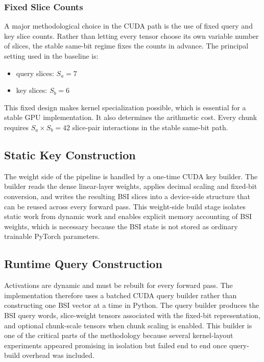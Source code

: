 \subsubsection{Fixed Slice Counts}
A major methodological choice in the CUDA path is the use of fixed query and key slice counts. Rather than letting every tensor choose its own variable number of slices, the stable same-bit regime fixes the counts in advance. The principal setting used in the baseline is:

\begin{itemize}[leftmargin=2em]
\item query slices: $S_a = 7$
\item key slices: $S_b = 6$
\end{itemize}

This fixed design makes kernel specialization possible, which is essential for a stable GPU implementation. It also determines the arithmetic cost. Every chunk requires $S_a \times S_b = 42$ slice-pair interactions in the stable same-bit path.

\subsection{Static Key Construction}
The weight side of the pipeline is handled by a one-time CUDA key builder. The builder reads the dense linear-layer weights, applies decimal scaling and fixed-bit conversion, and writes the resulting BSI slices into a device-side structure that can be reused across every forward pass. This weight-side build stage isolates static work from dynamic work and enables explicit memory accounting of BSI weights, which is necessary because the BSI state is not stored as ordinary trainable PyTorch parameters.

\subsection{Runtime Query Construction}
Activations are dynamic and must be rebuilt for every forward pass. The implementation therefore uses a batched CUDA query builder rather than constructing one BSI vector at a time in Python. The query builder produces the BSI query words, slice-weight tensors associated with the fixed-bit representation, and optional chunk-scale tensors when chunk scaling is enabled. This builder is one of the critical parts of the methodology because several kernel-layout experiments appeared promising in isolation but failed end to end once query-build overhead was included.

